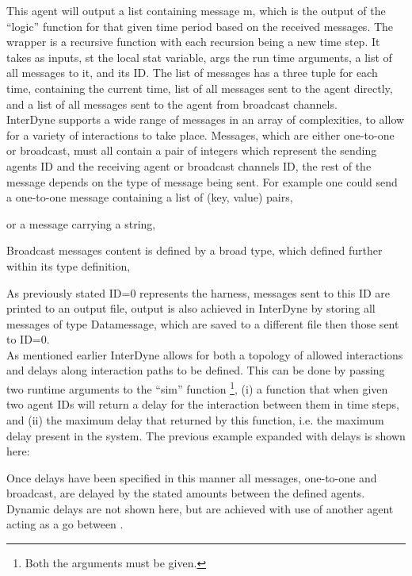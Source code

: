 \documentclass{article}
\begin{document}

This agent will output a list containing message m, which is the output of the ``logic'' function for that given time period based on the received messages. The wrapper is a recursive function with each recursion being a new time step. It takes as inputs, st the local stat variable, args the run time arguments, a list of all messages to it, and its ID.  The list of messages has a three tuple for each time, containing the current time, list of all messages sent to the agent directly, and a list of all messages sent to the agent from broadcast channels.\\ 
InterDyne supports a wide range of messages in an array of complexities, to allow for a variety of interactions to take place. Messages, which are either one-to-one or broadcast, must all contain a pair of integers which represent the sending agents ID and the receiving agent or broadcast channels ID, the rest of the message depends on the type of message being sent. For example one could send a one-to-one message containing a list of (key, value) pairs, 

or a message carrying a string, 

Broadcast messages content is defined by a broad type, which defined further within its type definition, 

As previously stated ID=0 represents the harness, messages sent to this ID are printed to an output file, output is also achieved in InterDyne by storing all messages of type Datamessage, which are saved to a different file then those sent to ID=0.\\  
As mentioned earlier InterDyne allows for both a topology of allowed interactions and delays along interaction paths to be defined. This can be done by passing two runtime arguments to the ``sim'' function \footnote{Both the arguments must be given.}, (i) a function that when given two agent IDs will return a delay for the interaction between them in time steps, and (ii) the maximum delay that returned by this function, i.e. the maximum delay present in the system. The previous example expanded with delays is shown here: 

Once delays have been specified in this manner all messages, one-to-one and broadcast, are delayed by the stated amounts between the defined agents. Dynamic delays are not shown here, but are achieved with use of another agent acting as a go between \cite{Chris_webPage}. 
 
\end{document}

